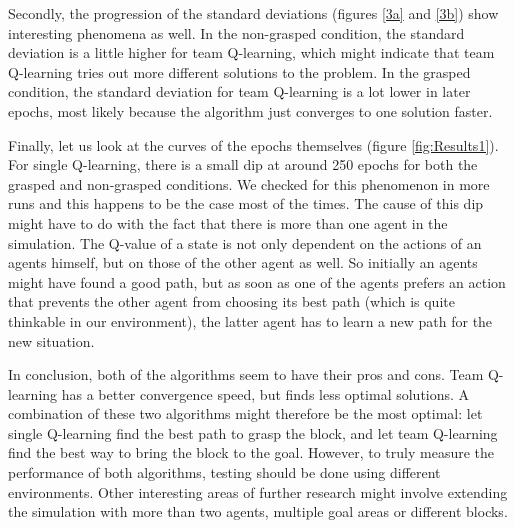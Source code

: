 Secondly, the progression of the standard deviations (figures \ref{3a} and \ref{3b}) show interesting phenomena as well. In the non-grasped condition, the standard deviation is a little higher for team Q-learning, which might indicate that team Q-learning tries out more different solutions to the problem. In the grasped condition, the standard deviation for team Q-learning is a lot lower in later epochs, most likely because the algorithm just converges to one solution faster.

Finally, let us look at the curves of the epochs themselves (figure \ref{fig:Results1}). For single Q-learning, there is a small dip at around 250 epochs for both the grasped and non-grasped conditions. We checked for this phenomenon in more runs and this happens to be the case most of the times. The cause of this dip might have to do with the fact that there is more than one agent in the simulation. The Q-value of a state is not only dependent on the actions of an agents himself, but on those of the other agent as well. So initially an agents might have found a good path, but as soon as one of the agents prefers an action that prevents the other agent from choosing its best path (which is quite thinkable in our environment), the latter agent has to learn a new path for the new situation. 

In conclusion, both of the algorithms seem to have their pros and cons. Team Q-learning has a better convergence speed, but finds less optimal solutions. A combination of these two algorithms might therefore be the most optimal: let single Q-learning find the best path to grasp the block, and let team Q-learning find the best way to bring the block to the goal. However, to truly measure the performance of both algorithms, testing should be done using different environments. Other interesting areas of further research might involve extending the simulation with more than two agents, multiple goal areas or different blocks.